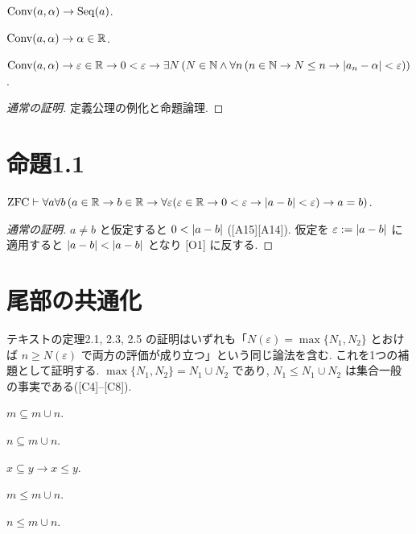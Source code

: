 \begin{lem}\label{lem:conv-unfold}
  \begin{enumerate}[label={[C\arabic*]}]
    \item $\mathrm{Conv}(a, \alpha) \to \mathrm{Seq}(a)$.
    \item $\mathrm{Conv}(a, \alpha) \to \alpha \in \mathbb{R}$.
    \item $\mathrm{Conv}(a, \alpha) \to \varepsilon \in \mathbb{R} \to 0 < \varepsilon \to \exists N\,(N \in \mathbb{N} \land \forall n\,(n \in \mathbb{N} \to N \leq n \to \lvert a_n - \alpha\rvert < \varepsilon))$.
  \end{enumerate}
\end{lem}
\begin{proof}[通常の証明]
  定義公理の例化と命題論理.
\end{proof}

\section{命題1.1}

\begin{prop}[テキスト命題1.1]\label{prop:eps-eq}
  $\mathrm{ZFC} \vdash \forall a\forall b\,(a \in \mathbb{R} \to b \in \mathbb{R} \to \forall\varepsilon(\varepsilon \in \mathbb{R} \to 0 < \varepsilon \to \lvert a - b\rvert < \varepsilon) \to a = b)$.
\end{prop}
\begin{proof}[通常の証明]
  $a \neq b$ と仮定すると $0 < \lvert a - b\rvert$ ([A15][A14]). 仮定を $\varepsilon := \lvert a - b\rvert$ に適用すると $\lvert a - b\rvert < \lvert a - b\rvert$ となり [O1] に反する.
\end{proof}

\section{尾部の共通化}

テキストの定理2.1, 2.3, 2.5 の証明はいずれも「$N(\varepsilon) = \max\{N_1, N_2\}$ とおけば $n \geq N(\varepsilon)$ で両方の評価が成り立つ」という同じ論法を含む. これを1つの補題として証明する. $\max\{N_1, N_2\} = N_1 \cup N_2$ であり, $N_1 \leq N_1 \cup N_2$ は集合一般の事実である([C4]--[C8]).

\begin{lem}\label{lem:cup}
  \begin{enumerate}[label={[C\arabic*]}, start=4]
    \item $m \subseteq m \cup n$.
    \item $n \subseteq m \cup n$.
    \item $x \subseteq y \to x \leq y$.
    \item $m \leq m \cup n$.
    \item $n \leq m \cup n$.
  \end{enumerate}
\end{lem}

